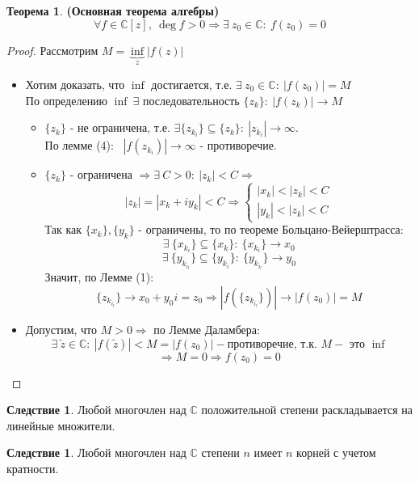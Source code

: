 \documentclass[a4paper, 12pt]{article}
\newcounter{concount}
\theoremstyle{definition}
\newtheorem*{theorem}{Теорема}
\newtheorem{consequensenum}[concount]{Следствие}
\begin{document}
  \begin{theorem} \textbf{(Основная теорема алгебры)} 
    $$\forall f \in \mathbb{C}[z], \ \deg f >0 \Longrightarrow  \exists \ z_0 \in \mathbb{C}: \ f(z_0) = 0$$
  \end{theorem}
  \begin{proof}
    Рассмотрим $M = \underbrace{\inf}_{z} |f(z)|$
    \begin{itemize}
      \item[\textit{1 шаг.}] Хотим доказать, что $\inf$ достигается, т.е. $\exists \ z_0 \in \mathbb{C}: \ |f(z_0)| = M$\\
      По определению $\inf \ \exists$ последовательность $\{z_k\}: \ |f(z_k)| \to M$
      \begin{itemize}
        \item[1 случай.] $\{z_k\}$  - не ограничена, т.е. $\exists  \{z_{k_i}\}\subseteq \{z_k\}: \ |z_{k_i}| \to \infty$. \\
        По лемме (4): \ $|f(z_{k_i})| \to \infty$ - противоречие. 
        \item[2 случай.] $\{z_k\}$ - ограничена $\Longrightarrow \exists \ C > 0: \ |z_k | < C \Longrightarrow$   
        $$|z_k| = |x_k + iy_k| < C \Longrightarrow \begin{cases}
          |x_k|<|z_k|<C \\
          |y_k|<|z_k|<C
        \end{cases}$$
        Так как $\{x_k\}, \{y_k\}$ - ограничены, то по теореме Больцано-Вейерштрасса:
        $$\exists \ \{x_{k_{i}}\}\subseteq \{x_{k}\}: \ \{x_{k_{i}}\} \to x_0$$
        $$\exists \ \{y_{k_{i_l}}\}\subseteq \{y_{k_{i}}\}: \ \{y_{k_{i_l}}\} \to y_0$$
        Значит, по Лемме (1):
        $$\{z_{k_{i_l}}\} \to x_0 + y_0i = z_0 \Longrightarrow |f(\{z_{k_{i_l}}\})| \to |f(z_0)| = M$$  
      \end{itemize}
      \item[\textit{2 шаг.}] Допустим, что $M>0 \Longrightarrow$ по Лемме Даламбера:
      $$\exists \ \widetilde{z} \in \mathbb{C}: \ |f(\widetilde{z})|<M = |f(z_0)| - \text{противоречие, т.к. } M - \text{ это } \inf $$
      $$\Longrightarrow M=0 \Longrightarrow f(z_0) =0$$  
    \end{itemize}
  \end{proof} 
  \begin{consequensenum}
    Любой многочлен над $\mathbb{C}$ положительной степени раскладывается на линейные множители. 
  \end{consequensenum}
  \begin{consequensenum}
    Любой многочлен над $\mathbb{C}$ степени $n$ имеет $n$ корней с учетом кратности. 
  \end{consequensenum} 
\end{document}

